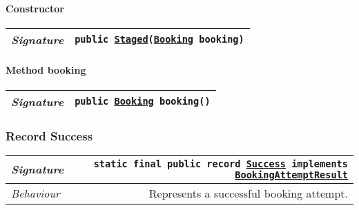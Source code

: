 \begin{adjustwidth}{1.5em}{0pt}
\begin{adjustwidth}{1.5em}{0pt}
\begin{adjustwidth}{1.5em}{0pt}
{\begin{tabularx}{1.0\linewidth}{@{}l R@{}}
      \end{tabularx}}\paragraph{Constructor\label{edu.kit.hci.soli.dto.BookingAttemptResult.Staged@edu.kit.hci.soli.dto.BookingAttemptResult.Staged(edu.kit.hci.soli.domain.Booking)}}
      \begin{adjustwidth}{1.5em}{0pt}
        {\begin{tabularx}{1.0\linewidth}{@{}l R@{}}
          \emph{Signature} & \texttt{public \texttt{\hyperref[edu.kit.hci.soli.dto.BookingAttemptResult.Staged]{\texttt{Staged}}}(\texttt{\hyperref[edu.kit.hci.soli.domain.Booking]{\texttt{Booking}}} booking)} \\
          \hline
  
        \end{tabularx}}
      \end{adjustwidth}\paragraph{Method booking\label{edu.kit.hci.soli.dto.BookingAttemptResult.Staged@booking()}}
      \begin{adjustwidth}{1.5em}{0pt}
        {\begin{tabularx}{1.0\linewidth}{@{}l R@{}}
          \emph{Signature} & \texttt{public \texttt{\hyperref[edu.kit.hci.soli.domain.Booking]{\texttt{Booking}}} booking()} \\
          \hline
  
        \end{tabularx}}
      \end{adjustwidth}
    \end{adjustwidth}\subsubsection{Record Success\label{edu.kit.hci.soli.dto.BookingAttemptResult.Success} }
    \begin{adjustwidth}{1.5em}{0pt}
      {\begin{tabularx}{1.0\linewidth}{@{}l R@{}}
        \emph{Signature} & \texttt{static final public  record \texttt{\hyperref[edu.kit.hci.soli.dto.BookingAttemptResult.Success]{\texttt{Success}} implements \texttt{\hyperref[edu.kit.hci.soli.dto.BookingAttemptResult]{\texttt{BookingAttemptResult}}}}} \\
        \hline
        \emph{Behaviour} & Represents a successful booking attempt.  \\
        \hline
  

\end{tabularx}}
\end{adjustwidth}
\end{adjustwidth}
\end{adjustwidth}
